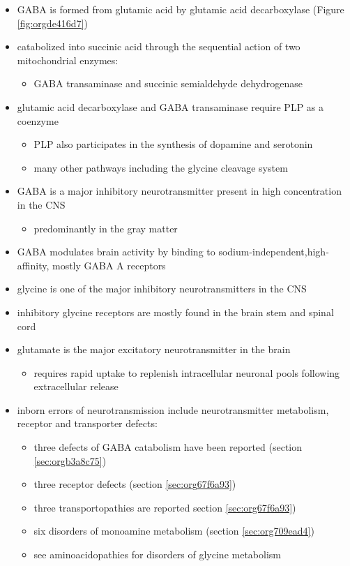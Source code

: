 \documentclass{scrartcl}
\begin{document}
\begin{itemize}
\item GABA is formed from glutamic acid by glutamic acid decarboxylase
(Figure \ref{fig:orgde416d7})
\item catabolized into succinic acid through the sequential action of two
mitochondrial enzymes:
\begin{itemize}
\item GABA transaminase and succinic semialdehyde dehydrogenase
\end{itemize}
\item glutamic acid decarboxylase and GABA transaminase require PLP as a coenzyme
\begin{itemize}
\item PLP also participates in the synthesis of dopamine and serotonin
\item many other pathways including the glycine cleavage system
\end{itemize}
\item GABA is a major inhibitory neurotransmitter present in high
concentration in the CNS
\begin{itemize}
\item predominantly in the gray matter
\end{itemize}
\item GABA modulates brain activity by binding to
sodium-independent,high-affinity, mostly GABA A receptors
\item glycine is one of the major inhibitory neurotransmitters in the CNS
\item inhibitory glycine receptors are mostly found in the brain stem
and spinal cord
\item glutamate is the major excitatory neurotransmitter in the brain
\begin{itemize}
\item requires rapid uptake to replenish intracellular
neuronal pools following extracellular release
\end{itemize}
\item inborn errors of neurotransmission include neurotransmitter
metabolism, receptor and transporter defects:
\begin{itemize}
\item three defects of GABA catabolism have been reported (section \ref{sec:orgb3a8c75})
\item three receptor defects (section \ref{sec:org67f6a93})
\item three transportopathies are reported section \ref{sec:org67f6a93})
\item six disorders of monoamine metabolism (section \ref{sec:org709ead4})
\item see aminoacidopathies for disorders of glycine metabolism
\end{itemize}
\end{itemize}
\end{document}
